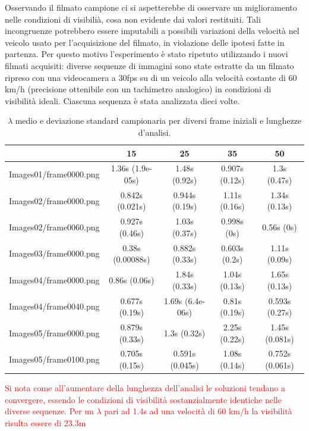 \documentclass[12pt]{report}
\begin{document}
\noindent Osservando il filmato campione ci si aspetterebbe di osservare un miglioramento nelle condizioni di visibili\`a, cosa non evidente dai valori restituiti. Tali incongruenze potrebbero essere imputabili a possibili variazioni della velocit\`a nel veicolo usato per l'acquisizione del filmato, in violazione delle ipotesi fatte in partenza. Per questo motivo l'esperimento \`e stato ripetuto utilizzando i nuovi filmati acquisiti: diverse sequenze di immagini sono state estratte da un filmato ripreso con una videocamera a 30fps su di un veicolo alla velocit\`a costante di 60 km/h (precisione ottenibile con un tachimetro analogico) in condizioni di visibilit\`a ideali. Ciascuna sequenza \`e stata analizzata dieci volte.\\

\begin{table}[H]
\centering
\begin{tabular}{|c|c|c|c|c|}
	\hline
	& 15 & 25 & 35 & 50 \\ \hline
	Images01/frame0000.png & 1.36s (1.9e-05s) & 1.48s (0.92s) & 0.907s (0.12s) & 1.3s (0.47s)\\ \hline
	Images02/frame0000.png & 0.842s (0.021s) & 0.944s (0.19s) & 1.11s (0.16s) & 1.34s (0.13s)\\ \hline
	Images02/frame0060.png & 0.927s (0.46s) & 1.03s (0.37s) & 0.998s (0s) & 0.56s (0s)\\ \hline
	Images03/frame0000.png & 0.38s (0.00088s) & 0.882s (0.33s) & 0.603s (0.2s) & 1.11s (0.09s)\\ \hline
	Images04/frame0000.png & 0.86s (0.06s) & 1.84s (0.33s) & 1.04s (0.13s) & 1.65s (0.13s)\\ \hline
	Images04/frame0040.png & 0.677s (0.19s) & 1.69s (6.4e-06s) & 0.81s (0.19s) & 0.593s (0.27s)\\ \hline
	Images05/frame0000.png & 0.879s (0.33s) & 1.3s (0.32s) & 2.25s (0.22s) & 1.45s (0.081s)\\ \hline
	Images05/frame0100.png & 0.705s (0.15s) & 0.591s (0.045s) & 1.08s (0.14s) & 0.752s (0.061s)\\ \hline
\end{tabular}
\caption{$\lambda$ medio e deviazione standard campionaria per diversi frame iniziali e lunghezze d'analisi.}
\end{table}

\noindent \textcolor{red}{Si nota come all'aumentare della lunghezza dell'analisi le soluzioni tendano a convergere, essendo le condizioni di visibilit\`a sostanzialmente identiche nelle diverse sequenze. Per un $\lambda$ pari ad 1.4s ad una velocit\`a di 60 km/h la visibilit\`a risulta essere di 23.3m}\\
\end{document}
